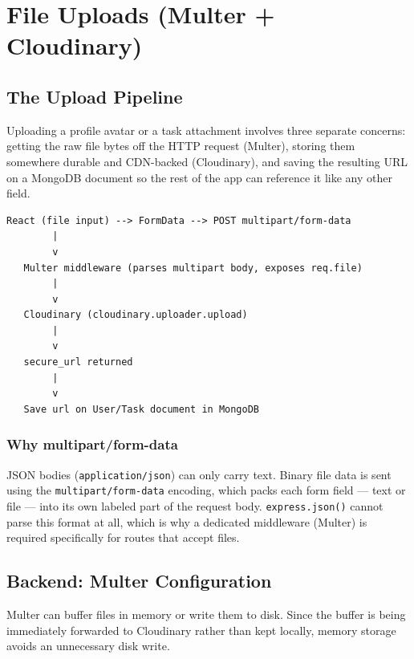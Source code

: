 \chapter{File Uploads (Multer + Cloudinary)}

\section{The Upload Pipeline}

Uploading a profile avatar or a task attachment involves three separate
concerns: getting the raw file bytes off the HTTP request (Multer), storing
them somewhere durable and CDN-backed (Cloudinary), and saving the resulting
URL on a MongoDB document so the rest of the app can reference it like any
other field.

\begin{diagrambox}
\begin{verbatim}
React (file input) --> FormData --> POST multipart/form-data
        |
        v
   Multer middleware (parses multipart body, exposes req.file)
        |
        v
   Cloudinary (cloudinary.uploader.upload)
        |
        v
   secure_url returned
        |
        v
   Save url on User/Task document in MongoDB
\end{verbatim}
\end{diagrambox}

\subsection{Why multipart/form-data}

JSON bodies (\texttt{application/json}) can only carry text. Binary file
data is sent using the \texttt{multipart/form-data} encoding, which packs
each form field --- text or file --- into its own labeled part of the request
body. \texttt{express.json()} cannot parse this format at all, which is why
a dedicated middleware (Multer) is required specifically for routes that
accept files.

\section{Backend: Multer Configuration}

Multer can buffer files in memory or write them to disk. Since the buffer is
being immediately forwarded to Cloudinary rather than kept locally, memory
storage avoids an unnecessary disk write.

